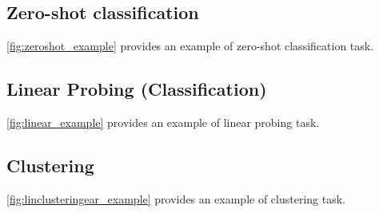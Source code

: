 \subsection{Zero-shot classification}
\autoref{fig:zeroshot_example} provides an example of zero-shot classification task.


\subsection{Linear Probing (Classification)}
\autoref{fig:linear_example} provides an example of linear probing task.


\subsection{Clustering}
\autoref{fig:linclusteringear_example} provides an example of clustering task.

